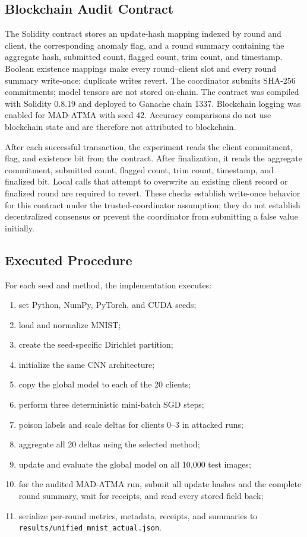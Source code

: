 \documentclass[10pt,letterpaper]{article}
\begin{document}
\subsection{Blockchain Audit Contract}

The Solidity contract stores an update-hash mapping indexed by round and
client, the corresponding anomaly flag, and a round summary containing the
aggregate hash, submitted count, flagged count, trim count, and timestamp.
Boolean existence mappings make every round--client slot and every round
summary write-once: duplicate writes revert. The coordinator submits SHA-256
commitments; model tensors are not stored on-chain. The contract was compiled
with Solidity 0.8.19 and deployed to Ganache chain 1337. Blockchain logging was
enabled for MAD-ATMA with seed 42. Accuracy comparisons do not use blockchain
state and are therefore not attributed to blockchain.

After each successful transaction, the experiment reads the client commitment,
flag, and existence bit from the contract. After finalization, it reads the
aggregate commitment, submitted count, flagged count, trim count, timestamp,
and finalized bit. Local calls that attempt to overwrite an existing client
record or finalized round are required to revert. These checks establish
write-once behavior for this contract under the trusted-coordinator assumption;
they do not establish decentralized consensus or prevent the coordinator from
submitting a false value initially.

\subsection{Executed Procedure}

For each seed and method, the implementation executes:
\begin{enumerate}[leftmargin=*]
    \item set Python, NumPy, PyTorch, and CUDA seeds;
    \item load and normalize MNIST;
    \item create the seed-specific Dirichlet partition;
    \item initialize the same CNN architecture;
    \item copy the global model to each of the 20 clients;
    \item perform three deterministic mini-batch SGD steps;
    \item poison labels and scale deltas for clients 0--3 in attacked runs;
    \item aggregate all 20 deltas using the selected method;
    \item update and evaluate the global model on all 10,000 test images;
    \item for the audited MAD-ATMA run, submit all update hashes and the complete
    round summary, wait for receipts, and read every stored field back;
    \item serialize per-round metrics, metadata, receipts, and summaries to
    \texttt{results/unified\_mnist\_actual.json}.
\end{enumerate}
\end{document}
